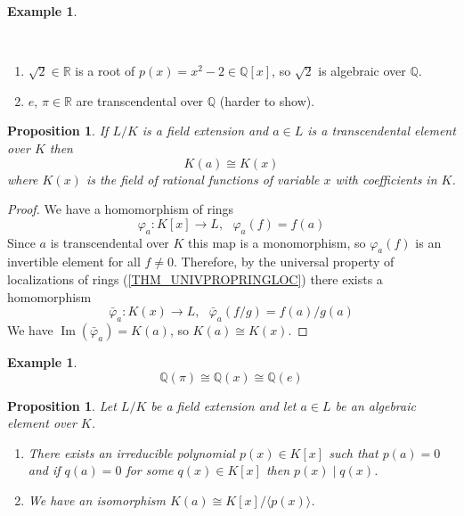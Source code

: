 \documentclass[12pt, letterpaper, oneside]{article}
\theoremstyle{plain}
\newtheorem{proposition}[theorem]{Proposition}
\theoremstyle{definition}
\newtheorem{example}[theorem]{Example}
\newcommand{\Q}{{\mathbb Q}}
\newcommand{\R}{{\mathbb R}}
\renewcommand{\Im}{\operatorname{Im}}
\newcommand{\subgp}[1]{\langle#1\rangle}
\newcommand{\benu}{\begin{enumerate}}
\newcommand{\eenu}{\end{enumerate}}
\newcommand{\vs}{\vskip 5mm}
\begin{document}
\vs\vs


\begin{example}\ 

\vskip -13mm

\ 
\benu
\item $\sqrt{2}\in \R$ is a root of $p(x)=  x^{2} -2 \in \Q[x]$, so $\sqrt{2}$ is algebraic over $\Q$.

\item $e$, $\pi \in \R$ are transcendental over $\Q$ (harder to show). 
\eenu


\end{example}

\vs\vs

\begin{proposition}
If $L/K$ is a field extension and $a\in L$ is a transcendental element over $K$ then 
$$K(a) \cong K(x)$$
where $K(x)$ is the field of rational functions of variable $x$ with coefficients in $K$.  
\end{proposition}


\vs

\begin{proof}
We have a homomorphism of rings
$$\varphi_{a}\colon K[x] \to L, \ \ \ \varphi_{a}(f) = f(a)$$
Since $a$ is transcendental over $K$ this map is a monomorphism, so $\varphi_{a}(f)$ 
is an invertible element for all $f\neq 0$.
Therefore, by the universal property of localizations of rings (\ref{THM_UNIVPROPRINGLOC}) 
there exists a homomorphism  
$$\bar{\varphi}_{a}\colon K(x) \to L, \ \ \ \bar{\varphi}_{a}(f/g) = f(a)/g(a)$$
We have $\Im(\bar{\varphi}_{a}) = K(a)$, so $K(a) \cong K(x)$.
\end{proof}


\vs\vs

\begin{example}
$$\Q(\pi) \cong \Q(x) \cong \Q(e)$$
\end{example}


\vs\vs


\begin{proposition}
\label{PROP_ALGETLEXT}
Let $L/K$ be a field extension and let $a\in L$ be an algebraic element over $K$.

\benu
\item There exists an irreducible polynomial $p(x)\in K[x]$ such that $p(a)=0$ and if 
$q(a) = 0$ for some $q(x)\in K[x]$ then $p(x)\mid  q(x)$.
\item We have an isomorphism $K(a)\cong K[x]/\subgp{p(x)}$.
\eenu

\end{proposition}
\end{document}

